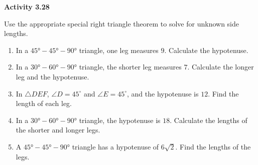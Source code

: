 \vspace{0.3ex}
\noindent\textbf{Activity 3.28}

\vspace{0.2ex}

Use the appropriate special right triangle theorem to solve for unknown side lengths.

\begin{enumerate}[label=\color{blue}\arabic*.]
    \item In a \(45°-45°-90°\) triangle, one leg measures \(9\). Calculate the hypotenuse.
    \item In a \(30°-60°-90°\) triangle, the shorter leg measures \(7\). Calculate the longer leg and the hypotenuse.
    \item In \(\triangle DEF\), \(\angle D = 45^\circ\) and \(\angle E = 45^\circ\), and the hypotenuse is \(12\). Find the length of each leg.
    \item In a \(30°-60°-90°\) triangle, the hypotenuse is \(18\). Calculate the lengths of the shorter and longer legs.
    \item A \(45°-45°-90°\) triangle has a hypotenuse of \(6\sqrt{2}\). Find the lengths of the legs.
\end{enumerate}
